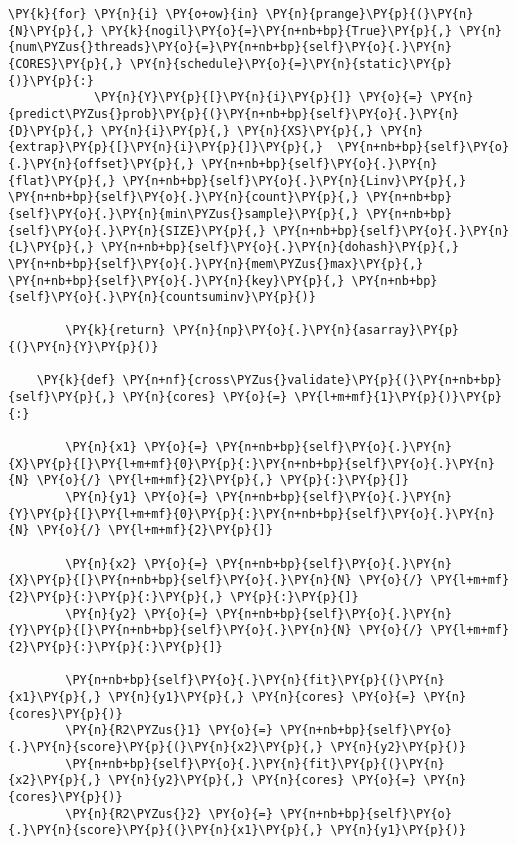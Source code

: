 \begin{Verbatim}[commandchars=\\\{\}]
        \PY{k}{for} \PY{n}{i} \PY{o+ow}{in} \PY{n}{prange}\PY{p}{(}\PY{n}{N}\PY{p}{,} \PY{k}{nogil}\PY{o}{=}\PY{n+nb+bp}{True}\PY{p}{,} \PY{n}{num\PYZus{}threads}\PY{o}{=}\PY{n+nb+bp}{self}\PY{o}{.}\PY{n}{CORES}\PY{p}{,} \PY{n}{schedule}\PY{o}{=}\PY{n}{static}\PY{p}{)}\PY{p}{:}
            \PY{n}{Y}\PY{p}{[}\PY{n}{i}\PY{p}{]} \PY{o}{=} \PY{n}{predict\PYZus{}prob}\PY{p}{(}\PY{n+nb+bp}{self}\PY{o}{.}\PY{n}{D}\PY{p}{,} \PY{n}{i}\PY{p}{,} \PY{n}{XS}\PY{p}{,} \PY{n}{extrap}\PY{p}{[}\PY{n}{i}\PY{p}{]}\PY{p}{,}  \PY{n+nb+bp}{self}\PY{o}{.}\PY{n}{offset}\PY{p}{,} \PY{n+nb+bp}{self}\PY{o}{.}\PY{n}{flat}\PY{p}{,} \PY{n+nb+bp}{self}\PY{o}{.}\PY{n}{Linv}\PY{p}{,} \PY{n+nb+bp}{self}\PY{o}{.}\PY{n}{count}\PY{p}{,} \PY{n+nb+bp}{self}\PY{o}{.}\PY{n}{min\PYZus{}sample}\PY{p}{,} \PY{n+nb+bp}{self}\PY{o}{.}\PY{n}{SIZE}\PY{p}{,} \PY{n+nb+bp}{self}\PY{o}{.}\PY{n}{L}\PY{p}{,} \PY{n+nb+bp}{self}\PY{o}{.}\PY{n}{dohash}\PY{p}{,} \PY{n+nb+bp}{self}\PY{o}{.}\PY{n}{mem\PYZus{}max}\PY{p}{,} \PY{n+nb+bp}{self}\PY{o}{.}\PY{n}{key}\PY{p}{,} \PY{n+nb+bp}{self}\PY{o}{.}\PY{n}{countsuminv}\PY{p}{)}
        
        \PY{k}{return} \PY{n}{np}\PY{o}{.}\PY{n}{asarray}\PY{p}{(}\PY{n}{Y}\PY{p}{)}

    \PY{k}{def} \PY{n+nf}{cross\PYZus{}validate}\PY{p}{(}\PY{n+nb+bp}{self}\PY{p}{,} \PY{n}{cores} \PY{o}{=} \PY{l+m+mf}{1}\PY{p}{)}\PY{p}{:}
        
        \PY{n}{x1} \PY{o}{=} \PY{n+nb+bp}{self}\PY{o}{.}\PY{n}{X}\PY{p}{[}\PY{l+m+mf}{0}\PY{p}{:}\PY{n+nb+bp}{self}\PY{o}{.}\PY{n}{N} \PY{o}{/} \PY{l+m+mf}{2}\PY{p}{,} \PY{p}{:}\PY{p}{]} 
        \PY{n}{y1} \PY{o}{=} \PY{n+nb+bp}{self}\PY{o}{.}\PY{n}{Y}\PY{p}{[}\PY{l+m+mf}{0}\PY{p}{:}\PY{n+nb+bp}{self}\PY{o}{.}\PY{n}{N} \PY{o}{/} \PY{l+m+mf}{2}\PY{p}{]}
    
        \PY{n}{x2} \PY{o}{=} \PY{n+nb+bp}{self}\PY{o}{.}\PY{n}{X}\PY{p}{[}\PY{n+nb+bp}{self}\PY{o}{.}\PY{n}{N} \PY{o}{/} \PY{l+m+mf}{2}\PY{p}{:}\PY{p}{:}\PY{p}{,} \PY{p}{:}\PY{p}{]}
        \PY{n}{y2} \PY{o}{=} \PY{n+nb+bp}{self}\PY{o}{.}\PY{n}{Y}\PY{p}{[}\PY{n+nb+bp}{self}\PY{o}{.}\PY{n}{N} \PY{o}{/} \PY{l+m+mf}{2}\PY{p}{:}\PY{p}{:}\PY{p}{]} 

        \PY{n+nb+bp}{self}\PY{o}{.}\PY{n}{fit}\PY{p}{(}\PY{n}{x1}\PY{p}{,} \PY{n}{y1}\PY{p}{,} \PY{n}{cores} \PY{o}{=} \PY{n}{cores}\PY{p}{)}
        \PY{n}{R2\PYZus{}1} \PY{o}{=} \PY{n+nb+bp}{self}\PY{o}{.}\PY{n}{score}\PY{p}{(}\PY{n}{x2}\PY{p}{,} \PY{n}{y2}\PY{p}{)}
        \PY{n+nb+bp}{self}\PY{o}{.}\PY{n}{fit}\PY{p}{(}\PY{n}{x2}\PY{p}{,} \PY{n}{y2}\PY{p}{,} \PY{n}{cores} \PY{o}{=} \PY{n}{cores}\PY{p}{)}
        \PY{n}{R2\PYZus{}2} \PY{o}{=} \PY{n+nb+bp}{self}\PY{o}{.}\PY{n}{score}\PY{p}{(}\PY{n}{x1}\PY{p}{,} \PY{n}{y1}\PY{p}{)}


\end{Verbatim}

